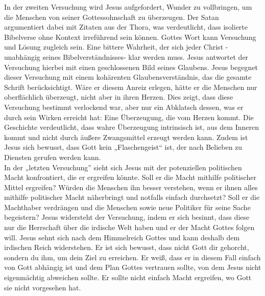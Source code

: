 In der zweiten Versuchung wird Jesus aufgefordert, Wunder zu vollbringen, um die Menschen von seiner Gottessohnschaft zu überzeugen. Der Satan argumentiert dabei mit Zitaten aus der Thora, was verdeutlicht, dass isolierte Bibelverse ohne Kontext irreführend sein können. Gottes Wort kann Versuchung und Lösung zugleich sein. Eine bittere Wahrheit, der sich jeder Christ -unabhängig seines Bibelverständnisses- klar werden muss. Jesus antwortet der Versuchung hierbei mit einen geschlossenen Bild seines Glaubens. Jesus begegnet dieser Versuchung mit einem kohärenten Glaubensverständnis, das die gesamte Schrift berücksichtigt. Wäre er diesem Anreiz erlegen, hätte er die Menschen nur oberflächlich überzeugt, nicht aber in ihren Herzen. Dies zeigt, dass diese Versuchung bestimmt verlockend war, aber nur ein Abklatsch dessen, was er durch sein Wirken erreicht hat: Eine Überzeugung, die vom Herzen kommt. Die Geschichte verdeutlicht, dass wahre Überzeugung intrinsisch ist, aus dem Inneren kommt und nicht durch äußere Zwangsmittel erzeugt werden kann. Zudem ist Jesus sich bewusst, dass Gott kein „Flaschengeist“ ist, der nach Belieben zu Diensten gerufen werden kann.\\

In der „letzten Versuchung” sieht sich Jesus mit der potenziellen politischen Macht konfrontiert, die er ergreifen könnte. Soll er die Macht mithilfe politischer Mittel ergreifen? Würden die Menschen ihn besser verstehen, wenn er ihnen alles mithilfe politischer Macht näherbringt und notfalls einfach durchsetzt? Soll er die Machthaber verdrängen und die Menschen sowie neue Politiker für seine Sache begeistern? Jesus widersteht der Versuchung, indem er sich besinnt, dass diese nur die Herrschaft über die irdische Welt haben und er der Macht Gottes folgen will. Jesus sehnt sich nach dem Himmelreich Gottes und kann deshalb dem irdischen Reich widerstehen. Er ist sich bewusst, dass nicht Gott dir gehorcht, sondern du ihm, um dein Ziel zu erreichen. Er weiß, dass er in diesem Fall einfach von Gott abhängig ist und dem Plan Gottes vertrauen sollte, von dem Jesus nicht eigenmächtig abweichen sollte. Er sollte nicht einfach Macht ergreifen, wo Gott sie nicht vorgesehen hat.\\

